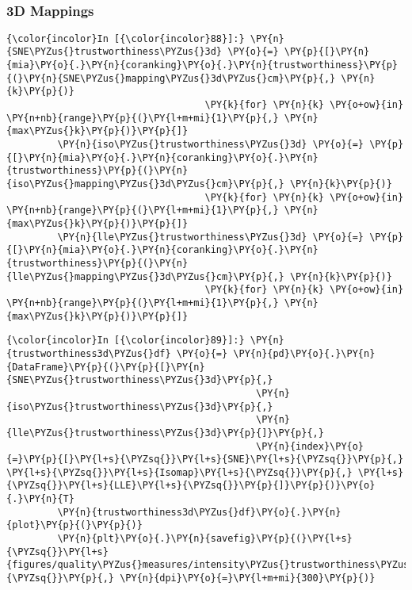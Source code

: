     \begin{center}
    \end{center}
    { \hspace*{\fill} \\}

    \subsubsection{3D Mappings}\label{d-mappings}

    \begin{Verbatim}[commandchars=\\\{\}]
{\color{incolor}In [{\color{incolor}88}]:} \PY{n}{SNE\PYZus{}trustworthiness\PYZus{}3d} \PY{o}{=} \PY{p}{[}\PY{n}{mia}\PY{o}{.}\PY{n}{coranking}\PY{o}{.}\PY{n}{trustworthiness}\PY{p}{(}\PY{n}{SNE\PYZus{}mapping\PYZus{}3d\PYZus{}cm}\PY{p}{,} \PY{n}{k}\PY{p}{)}
                                   \PY{k}{for} \PY{n}{k} \PY{o+ow}{in} \PY{n+nb}{range}\PY{p}{(}\PY{l+m+mi}{1}\PY{p}{,} \PY{n}{max\PYZus{}k}\PY{p}{)}\PY{p}{]}
         \PY{n}{iso\PYZus{}trustworthiness\PYZus{}3d} \PY{o}{=} \PY{p}{[}\PY{n}{mia}\PY{o}{.}\PY{n}{coranking}\PY{o}{.}\PY{n}{trustworthiness}\PY{p}{(}\PY{n}{iso\PYZus{}mapping\PYZus{}3d\PYZus{}cm}\PY{p}{,} \PY{n}{k}\PY{p}{)}
                                   \PY{k}{for} \PY{n}{k} \PY{o+ow}{in} \PY{n+nb}{range}\PY{p}{(}\PY{l+m+mi}{1}\PY{p}{,} \PY{n}{max\PYZus{}k}\PY{p}{)}\PY{p}{]}
         \PY{n}{lle\PYZus{}trustworthiness\PYZus{}3d} \PY{o}{=} \PY{p}{[}\PY{n}{mia}\PY{o}{.}\PY{n}{coranking}\PY{o}{.}\PY{n}{trustworthiness}\PY{p}{(}\PY{n}{lle\PYZus{}mapping\PYZus{}3d\PYZus{}cm}\PY{p}{,} \PY{n}{k}\PY{p}{)}
                                   \PY{k}{for} \PY{n}{k} \PY{o+ow}{in} \PY{n+nb}{range}\PY{p}{(}\PY{l+m+mi}{1}\PY{p}{,} \PY{n}{max\PYZus{}k}\PY{p}{)}\PY{p}{]}
\end{Verbatim}

    \begin{Verbatim}[commandchars=\\\{\}]
{\color{incolor}In [{\color{incolor}89}]:} \PY{n}{trustworthiness3d\PYZus{}df} \PY{o}{=} \PY{n}{pd}\PY{o}{.}\PY{n}{DataFrame}\PY{p}{(}\PY{p}{[}\PY{n}{SNE\PYZus{}trustworthiness\PYZus{}3d}\PY{p}{,}
                                            \PY{n}{iso\PYZus{}trustworthiness\PYZus{}3d}\PY{p}{,}
                                            \PY{n}{lle\PYZus{}trustworthiness\PYZus{}3d}\PY{p}{]}\PY{p}{,}
                                            \PY{n}{index}\PY{o}{=}\PY{p}{[}\PY{l+s}{\PYZsq{}}\PY{l+s}{SNE}\PY{l+s}{\PYZsq{}}\PY{p}{,} \PY{l+s}{\PYZsq{}}\PY{l+s}{Isomap}\PY{l+s}{\PYZsq{}}\PY{p}{,} \PY{l+s}{\PYZsq{}}\PY{l+s}{LLE}\PY{l+s}{\PYZsq{}}\PY{p}{]}\PY{p}{)}\PY{o}{.}\PY{n}{T}
         \PY{n}{trustworthiness3d\PYZus{}df}\PY{o}{.}\PY{n}{plot}\PY{p}{(}\PY{p}{)}
         \PY{n}{plt}\PY{o}{.}\PY{n}{savefig}\PY{p}{(}\PY{l+s}{\PYZsq{}}\PY{l+s}{figures/quality\PYZus{}measures/intensity\PYZus{}trustworthiness\PYZus{}3d.png}\PY{l+s}{\PYZsq{}}\PY{p}{,} \PY{n}{dpi}\PY{o}{=}\PY{l+m+mi}{300}\PY{p}{)}
\end{Verbatim}

